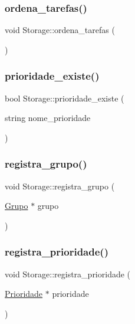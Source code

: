 \subsubsection{\texorpdfstring{ordena\+\_\+tarefas()}{ordena\_tarefas()}}
{\footnotesize\ttfamily void Storage\+::ordena\+\_\+tarefas (\begin{DoxyParamCaption}{ }\end{DoxyParamCaption})}

\mbox{\label{classStorage_aaa42cd171fb2624c9675e2b220d532e4}} 
\subsubsection{\texorpdfstring{prioridade\+\_\+existe()}{prioridade\_existe()}}
{\footnotesize\ttfamily bool Storage\+::prioridade\+\_\+existe (\begin{DoxyParamCaption}\item[{string}]{nome\+\_\+prioridade }\end{DoxyParamCaption})}

\mbox{\label{classStorage_a566777194a365ed00d442ec3d531e146}} 
\subsubsection{\texorpdfstring{registra\+\_\+grupo()}{registra\_grupo()}}
{\footnotesize\ttfamily void Storage\+::registra\+\_\+grupo (\begin{DoxyParamCaption}\item[{\hyperlink{classGrupo}{Grupo} $\ast$}]{grupo }\end{DoxyParamCaption})}

\mbox{\label{classStorage_a203e5aad2fc6a8fbd4a23b37c4cb9f3c}} 
\subsubsection{\texorpdfstring{registra\+\_\+prioridade()}{registra\_prioridade()}}
{\footnotesize\ttfamily void Storage\+::registra\+\_\+prioridade (\begin{DoxyParamCaption}\item[{\hyperlink{classPrioridade}{Prioridade} $\ast$}]{prioridade }\end{DoxyParamCaption})}

